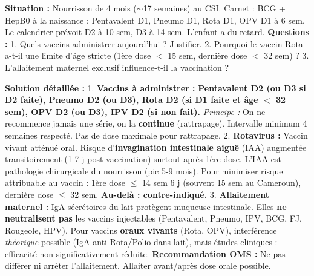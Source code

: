 \documentclass[11pt]{article}
\begin{document}
\begin{exoresolu}
\textbf{Situation :} Nourrisson de 4 mois ($\sim$17 semaines) au CSI. Carnet : BCG + HepB0 à la naissance ; Pentavalent D1, Pneumo D1, Rota D1, OPV D1 à 6 sem. Le calendrier prévoit D2 à 10 sem, D3 à 14 sem. L'enfant a du retard.
\textbf{Questions :}
1. Quels vaccins administrer aujourd'hui ? Justifier.
2. Pourquoi le vaccin Rota a-t-il une limite d'âge stricte (1ère dose $<$ 15 sem, dernière dose $<$ 32 sem) ?
3. L'allaitement maternel exclusif influence-t-il la vaccination ?

\textbf{Solution détaillée :}
1. \textbf{Vaccins à administrer :} \textbf{Pentavalent D2 (ou D3 si D2 faite), Pneumo D2 (ou D3), Rota D2 (si D1 faite et âge $<$ 32 sem), OPV D2 (ou D3), IPV D2 (si non fait).} \emph{Principe :} On ne recommence jamais une série, on la \textbf{continue} (rattrapage). Intervalle minimum 4 semaines respecté. Pas de dose maximale pour rattrapage.
2. \textbf{Rotavirus :} Vaccin vivant atténué oral. Risque d'\textbf{invagination intestinale aiguë} (IAA) augmentée transitoirement (1-7 j post-vaccination) surtout après 1ère dose. L'IAA est pathologie chirurgicale du nourrisson (pic 5-9 mois). Pour minimiser risque attribuable au vaccin : 1ère dose $\le$ 14 sem 6 j (souvent 15 sem au Cameroun), dernière dose $\le$ 32 sem. \textbf{Au-delà : contre-indiqué.}
3. \textbf{Allaitement maternel :} IgA sécrétoires du lait protègent muqueuse intestinale. Elles \textbf{ne neutralisent pas} les vaccins injectables (Pentavalent, Pneumo, IPV, BCG, FJ, Rougeole, HPV). Pour vaccins \textbf{oraux vivants} (Rota, OPV), interférence \emph{théorique} possible (IgA anti-Rota/Polio dans lait), mais études cliniques : efficacité non significativement réduite. \textbf{Recommandation OMS :} Ne pas différer ni arrêter l'allaitement. Allaiter avant/après dose orale possible.
\end{exoresolu}
\end{document}
